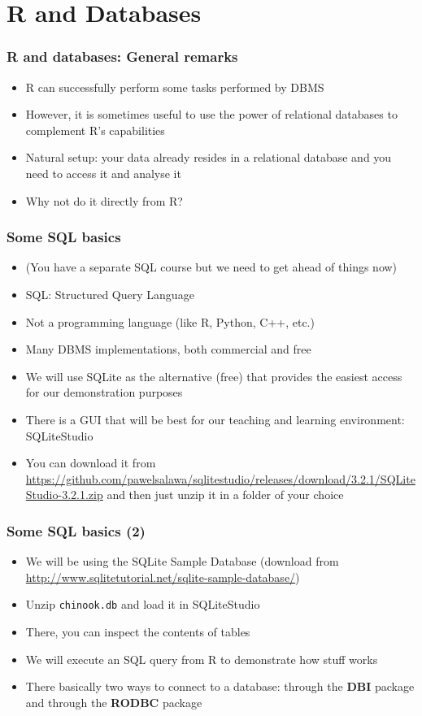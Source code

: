 \documentclass[10pt]{beamer}
\theoremstyle{definition}
\begin{document}
\section{R and Databases}
\begin{frame}[fragile]
\frametitle{R and databases: General remarks}
\begin{itemize}
	\item R can successfully perform some tasks performed by DBMS
	\item However, it is sometimes useful to use the power of relational databases to complement R's capabilities
	\item Natural setup: your data already resides in a relational database and you need to access it and analyse it
	\item Why not do it directly from R?
\end{itemize}
\end{frame}

\begin{frame}[fragile]
\frametitle{Some SQL basics}
\begin{itemize}
	\item (You have a separate SQL course but we need to get ahead of things now)
	\item SQL: Structured Query Language
	\item Not a programming language (like R, Python, C++, etc.)
	\item Many DBMS implementations, both commercial and free
	\item We will use SQLite as the alternative (free) that provides the easiest access for our demonstration purposes
	\item There is a GUI that will be best for our teaching and learning environment: SQLiteStudio
	\item You can download it from \url{https://github.com/pawelsalawa/sqlitestudio/releases/download/3.2.1/SQLiteStudio-3.2.1.zip} and then just unzip it in a folder of your choice
\end{itemize}
\end{frame}

\begin{frame}[fragile]
\frametitle{Some SQL basics (2)}
\begin{itemize}
	\item We will be using the SQLite Sample Database (download from \url{http://www.sqlitetutorial.net/sqlite-sample-database/})
	\item Unzip \texttt{chinook.db} and load it in SQLiteStudio
	\item There, you can inspect the contents of tables
	\item We will execute an SQL query from R to demonstrate how stuff works
	\item There basically two ways to connect to a database: through the \textbf{DBI} package and through the \textbf{RODBC} package
\end{itemize}
\end{frame}
\end{document}

